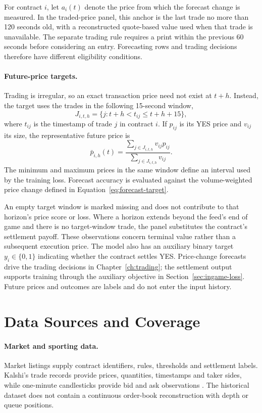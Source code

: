 \documentclass[12pt,a4paper,oneside]{report}
\begin{document}
For contract $i$, let $a_i(t)$ denote the price from which the forecast change is
measured. In the traded-price panel, this anchor is the last trade no more than
120 seconds old, with a reconstructed quote-based value used when that trade is
unavailable. The separate trading rule requires a print within the previous
60 seconds before considering an entry. Forecasting rows and trading decisions
therefore have different eligibility conditions.

\paragraph{Future-price targets.}
Trading is irregular, so an exact transaction price need not exist at $t+h$.
Instead, the target uses the trades in the following 15-second window,
\begin{equation}
  J_{i,t,h}=\{j: t+h < t_{ij}\leq t+h+15\},
\end{equation}
where $t_{ij}$ is the timestamp of trade $j$ in contract $i$. If $p_{ij}$ is its
YES price and $v_{ij}$ its size, the representative future price is
\begin{equation}
  \bar p_{i,h}(t)=
  \frac{\sum_{j\in J_{i,t,h}}v_{ij}p_{ij}}
       {\sum_{j\in J_{i,t,h}}v_{ij}}.
\end{equation}
The minimum and maximum prices in the same window define an interval used by
the training loss. Forecast accuracy is evaluated against the volume-weighted
price change defined in Equation~\eqref{eq:forecast-target}.

An empty target window is marked missing and does not contribute to that
horizon's price score or loss. Where a horizon extends beyond the feed's end of
game and there is no target-window trade, the panel substitutes the contract's
settlement payoff. These observations concern terminal value rather than a
subsequent execution price. The model also has an auxiliary binary target
$y_i\in\{0,1\}$ indicating whether the contract settles YES. Price-change
forecasts drive the trading decisions in Chapter~\ref{ch:trading}; the settlement
output supports training through the auxiliary objective in
Section~\ref{sec:ingame-loss}. Future prices and outcomes are labels and do not
enter the input history.

\section{Data Sources and Coverage}\label{sec:data-sources}
\paragraph{Market and sporting data.}
Market listings supply contract identifiers, rules, thresholds and settlement
labels. Kalshi's trade records provide prices, quantities, timestamps and taker
sides, while one-minute candlesticks provide bid and ask observations
\citep{kalshi2026trades,kalshi2026candles}. The historical dataset does not contain
a continuous order-book reconstruction with depth or queue positions.
\end{document}
